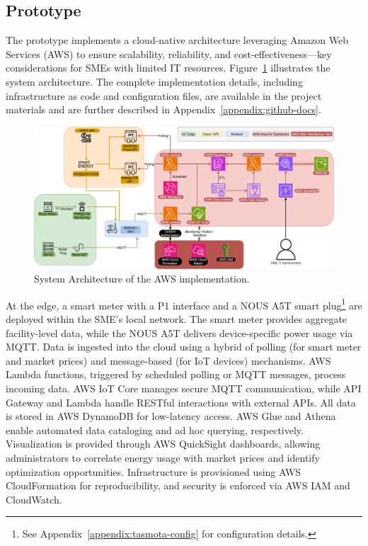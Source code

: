 \subsection{Prototype}
\label{methodology:prototype}
The prototype implements a cloud-native architecture leveraging Amazon Web Services (AWS) to ensure scalability, reliability, and cost-effectiveness—key considerations for SMEs with limited IT resources. Figure~\ref{fig:architecture} illustrates the system architecture. The complete implementation details, including infrastructure as code and configuration files, are available in the project materials and are further described in Appendix~\ref{appendix:github-docs}.
\begin{figure}[htbp]
\centering
\includegraphics[width=1.1\textwidth]{fig/architektur_new_2.png}
\caption{System Architecture of the AWS implementation.}
\label{fig:architecture}
\end{figure}
At the edge, a smart meter with a P1 interface and a NOUS A5T smart plug\footnote{See Appendix~\ref{appendix:tasmota-config} for configuration details.} are deployed within the SME's local network. The smart meter provides aggregate facility-level data, while the NOUS A5T delivers device-specific power usage via MQTT. Data is ingested into the cloud using a hybrid of polling (for smart meter and market prices) and message-based (for IoT devices) mechanisms.
AWS Lambda functions, triggered by scheduled polling or MQTT messages, process incoming data. AWS IoT Core manages secure MQTT communication, while API Gateway and Lambda handle RESTful interactions with external APIs. All data is stored in AWS DynamoDB for low-latency access. AWS Glue and Athena enable automated data cataloging and ad hoc querying, respectively. Visualization is provided through AWS QuickSight dashboards, allowing administrators to correlate energy usage with market prices and identify optimization opportunities. Infrastructure is provisioned using AWS CloudFormation for reproducibility, and security is enforced via AWS IAM and CloudWatch.
